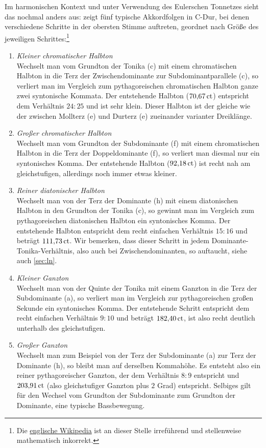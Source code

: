 Im harmonischen Kontext und unter Verwendung des Eulerschen Tonnetzes sieht das
nochmal anders aus:  zeigt fünf typische Akkordfolgen in C-Dur,
bei denen verschiedene Schritte in der obersten Stimme auftreten, geordnet nach
Größe des jeweiligen Schrittes:\footnote{Die
  \href{https://en.wikipedia.org/wiki/Semitone\#Just_intonation}{englische
    Wikipedia} ist an dieser Stelle irreführend und stellenweise mathematisch
  inkorrekt.}
\begin{enumerate}
\item \emph{Kleiner chromatischer Halbton}\\
  Wechselt man vom Grundton der Tonika (c) mit einem chromatischen Halbton in
  die Terz der Zwischendominante zur Subdominantparallele (\sharpmm c), so
  verliert man im Vergleich zum pythagoreischen chromatischen Halbton ganze zwei
  syntonische Kommata. Der entstehende Halbton ($70{,}67\,\text{ct}$) entspricht dem
  Verhältnis $24:25$ und ist sehr klein. Dieser Halbton ist der gleiche wie der
  zwischen Mollterz (\flatp e) und Durterz (\naturalm e) zueinander varianter
  Dreiklänge.
\item \emph{Großer chromatischer Halbton}\\
  Wechselt man vom Grundton der Subdominante (f) mit einem chromatischen Halbton
  in die Terz der Doppeldominante (\sharpm f), so verliert man diesmal nur ein
  syntonisches Komma.  Der entstehende Halbton ($92{,}18\,\text{ct}$) ist recht nah am
  gleichstufigen, allerdings noch immer etwas
  kleiner.
\item \emph{Reiner diatonischer Halbton}\\
  Wechselt man von der Terz der Dominante (\naturalm h) mit einem diatonischen
  Halbton in den Grundton der Tonika (c), so gewinnt man im Vergleich zum
  pythagoreischen diatonischen Halbton ein syntonisches Komma.  Der entstehende
  Halbton entspricht dem recht einfachen Verhältnis $15:16$ und beträgt
  $111{,}73\,\text{ct}$.  Wir bemerken, dass dieser Schritt in jedem
  Dominante-Tonika-Verhältnis, also auch bei Zwischendominanten, so auftaucht,
  siehe auch \cref{sec:ln}.
\item \emph{Kleiner Ganzton}\\
  Wechselt man von der Quinte der Tonika mit einem Ganzton in die Terz der
  Subdominante (\naturalm a), so verliert man im Vergleich zur pythagoreischen
  großen Sekunde ein syntonisches Komma. Der entstehende Schritt entspricht dem
  recht einfachen Verhältnis \mbox{$9:10$} und beträgt $182{,}40\,\text{ct}$, ist also
  recht deutlich unterhalb des gleichstufigen.
\item \emph{Großer Ganzton}\\
  Wechselt man zum Beispiel von der Terz der Subdominante (\naturalm a) zur Terz
  der Dominante (\naturalm h), so bleibt man auf derselben Kommahöhe. Es
  entsteht also ein reiner pythagoreischer Ganzton, der dem Verhältnis
  $8:9$ entspricht und $203{,}91\,\text{ct}$ (also gleichstufiger Ganzton plus
  $2$ Grad) entspricht.  Selbiges gilt für den Wechsel vom Grundton der
  Subdominante zum Grundton der Dominante, eine typische Bassbewegung.
\end{enumerate}


